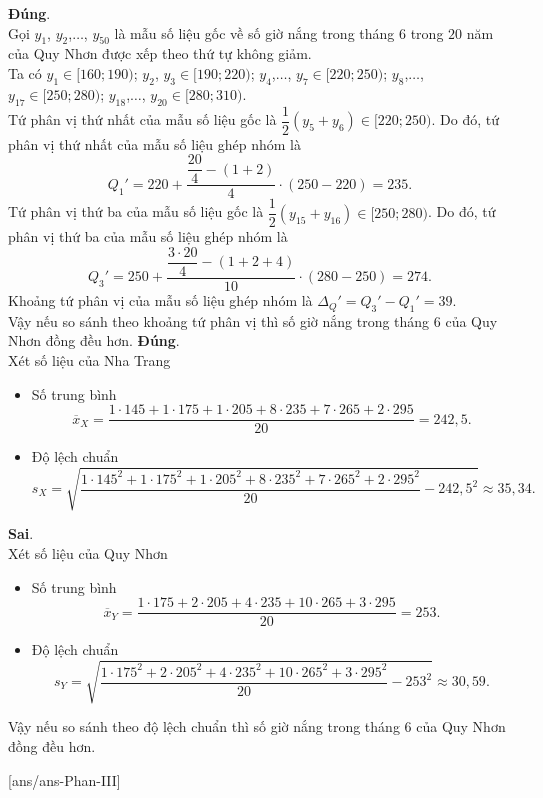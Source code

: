 \begin{ex}
{\begin{itemchoice}
 \itemch \textbf{Đúng}.\\
 Gọi $y_{1}$, $y_{2}$,$\ldots$, $y_{50}$ là mẫu số liệu gốc về số giờ nắng trong tháng $6$ trong $20$ năm của Quy Nhơn được xếp theo thứ tự không giảm.\\
 Ta có $y_{1} \in[160;190)$; $y_{2}$, $y_{3} \in[190;220)$; $y_{4}$,$\ldots$, $y_{7} \in[220;250)$; $y_{8} $,$\ldots$, $y_{17} \in[250;280)$;
 $y_{18}$,$\ldots$, $y_{20} \in[280;310)$.\\
 Tứ phân vị thứ nhất của mẫu số liệu gốc là $\dfrac{1}{2}\left(y_{5}+y_{6}\right) \in[220;250)$. Do đó, tứ phân vị thứ nhất của mẫu số liệu ghép nhóm là \[Q_{1}'=220+\dfrac{\dfrac{20}{4}-(1+2)}{4}\cdot(250-220)=235.\]
 Tứ phân vị thứ ba của mẫu số liệu gốc là $\dfrac{1}{2}\left(y_{15}+y_{16}\right) \in[250;280)$. Do đó, tứ phân vị thứ ba của mẫu số liệu ghép nhóm là \[Q_{3}'=250+\dfrac{\dfrac{3\cdot 20}{4}-(1+2+4)}{10}\cdot(280-250)=274.\]
 Khoảng tứ phân vị của mẫu số liệu ghép nhóm là $\Delta_{Q}'=Q_{3}'-Q_{1}'=39$.\\
 Vậy nếu so sánh theo khoảng tứ phân vị thì số giờ nắng trong tháng $6$ của Quy Nhơn đồng đều hơn.
 \itemch \textbf{Đúng}.\\
 Xét số liệu của Nha Trang
 \begin{itemize}
 \item Số trung bình 
 \[\overline{x}_{X}=\dfrac{1\cdot 145+1\cdot 175+1\cdot 205+8\cdot 235+7\cdot 265+2\cdot 295}{20}=242{,}5.\]
 \item Độ lệch chuẩn \[s_{X}=\sqrt{\dfrac{1\cdot 145^{2}+1\cdot 175^{2}+1\cdot 205^{2}+8\cdot 235^{2}+7\cdot 265^{2}+2\cdot 295^{2}}{20}-242{,}5^{2}} \approx 35{,}34.\]
 \end{itemize}
 \itemch \textbf{Sai}.\\
 Xét số liệu của Quy Nhơn
 \begin{itemize}
 \item Số trung bình 
 \[\overline{x}_{Y}=\dfrac{1\cdot 175+2\cdot 205+4\cdot 235+10\cdot 265+3\cdot 295}{20}=253.\]
 \item Độ lệch chuẩn 
 \[s_{Y}=\sqrt{\dfrac{1\cdot 175^{2}+2\cdot 205^{2}+4\cdot 235^{2}+10\cdot 265^{2}+3\cdot 295^{2}}{20}-253^{2}} \approx 30{,}59.\]
 \end{itemize}
 Vậy nếu so sánh theo độ lệch chuẩn thì số giờ nắng trong tháng $6$ của Quy Nhơn đồng đều hơn.
 \end{itemchoice}
 }
\end{ex}

\TNSA
{}[ans/ans\currfilebase-Phan-III]

